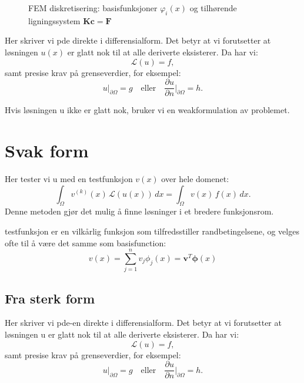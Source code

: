 \documentclass[../main.tex]{subfiles}
\begin{document}
\begin{figure}[H]
    \caption{FEM diskretisering: basisfunksjoner $\varphi_i(x)$ og tilhørende ligningssystem $\mathbf{K}\mathbf{c} = \mathbf{F}$}
    \label{fig:fem_discretization}
\end{figure}


Her skriver vi pde direkte i differensialform.
Det betyr at vi forutsetter at løsningen \(u(x)\) er glatt nok til at alle deriverte eksisterer.
Da har vi:
\[
    \mathcal{L}(u) = f,
\]
samt presise krav på grenseverdier, for eksempel:
\[
    u|_{\partial \Omega} = g \quad \text{eller} \quad \frac{\partial u}{\partial n}\bigg|_{\partial \Omega} = h.
\]

Hvis løsningen u ikke er glatt nok, bruker vi en weakformulation av problemet.

\section{Svak form}

Her tester vi u med en testfunksjon \(v(x)\) over hele domenet:
\[
    \int_\Omega v^{(k)}(x) \, \mathcal{L}(u(x)) \, dx = \int_\Omega v(x) \, f(x) \, dx.
\]
Denne metoden gjør det mulig å finne løsninger i et bredere funksjonsrom.

testfunksjon er en vilkårlig funksjon som tilfredsstiller randbetingelsene, og velges ofte til å være det samme som basisfunction:
\[
    v(x) = \sum_{j=1}^n v_j \phi_j(x) = \symbf{v}^T \symbf{\phi}(x)
\]


\subsection{Fra sterk form}
Her skriver vi pde-en direkte i differensialform. Det betyr at vi forutsetter at løsningen u er glatt nok til at alle deriverte eksisterer. Da har vi:
\[
    \mathcal{L}(u) = f,
\]
samt presise krav på grenseverdier, for eksempel:
\[
    u|_{\partial \Omega} = g \quad \text{eller} \quad \frac{\partial u}{\partial n}\bigg|_{\partial \Omega} = h.
\]
\end{document}

